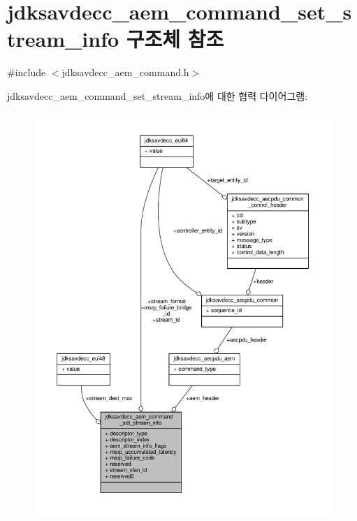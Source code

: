 \hypertarget{structjdksavdecc__aem__command__set__stream__info}{}\section{jdksavdecc\+\_\+aem\+\_\+command\+\_\+set\+\_\+stream\+\_\+info 구조체 참조}
\label{structjdksavdecc__aem__command__set__stream__info}


{\ttfamily \#include $<$jdksavdecc\+\_\+aem\+\_\+command.\+h$>$}



jdksavdecc\+\_\+aem\+\_\+command\+\_\+set\+\_\+stream\+\_\+info에 대한 협력 다이어그램\+:
\nopagebreak
\begin{figure}[H]
\begin{center}
\leavevmode
\includegraphics[width=350pt]{structjdksavdecc__aem__command__set__stream__info__coll__graph}
\end{center}
\end{figure}
